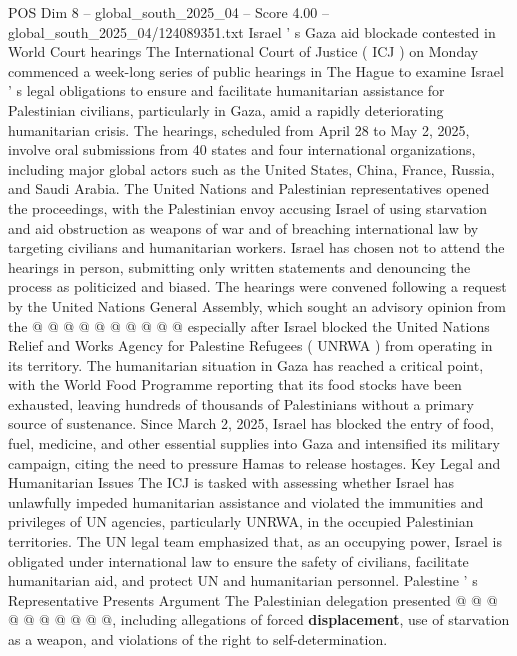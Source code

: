 \begin{textsample}{POS Dim 8 – global\_south\_2025\_04 – Score 4.00 – global\_south\_2025\_04/124089351.txt}  \label{ex:f8_pos_168}
Israel ' s Gaza aid blockade contested in World Court hearings The International Court of Justice ( ICJ ) on Monday commenced a week-long series of public hearings in The Hague to examine Israel ' s legal obligations to ensure and facilitate humanitarian assistance for Palestinian civilians, particularly in Gaza, amid a rapidly deteriorating humanitarian crisis.
The hearings, scheduled from April 28 to May 2, 2025, involve oral submissions from 40 states and four international organizations, including major global actors such as the United States, China, France, Russia, and Saudi Arabia.
The United Nations and Palestinian representatives opened the proceedings, with the Palestinian envoy accusing Israel of using starvation and aid obstruction as weapons of war and of breaching international law by targeting civilians and humanitarian workers.
Israel has chosen not to attend the hearings in person, submitting only written statements and denouncing the process as politicized and biased.
The hearings were convened following a request by the United Nations General Assembly, which sought an advisory opinion from the @ @ @ @ @ @ @ @ @ @ especially after Israel blocked the United Nations Relief and Works Agency for Palestine Refugees ( UNRWA ) from operating in its territory.
The humanitarian situation in Gaza has reached a critical point, with the World Food Programme reporting that its food stocks have been exhausted, leaving hundreds of thousands of Palestinians without a primary source of sustenance.
Since March 2, 2025, Israel has blocked the entry of food, fuel, medicine, and other essential supplies into Gaza and intensified its military campaign, citing the need to pressure Hamas to release hostages.
Key Legal and Humanitarian Issues The ICJ is tasked with assessing whether Israel has unlawfully impeded humanitarian assistance and violated the immunities and privileges of UN agencies, particularly UNRWA, in the occupied Palestinian territories.
The UN legal team emphasized that, as an occupying power, Israel is obligated under international law to ensure the safety of civilians, facilitate humanitarian aid, and protect UN and humanitarian personnel.
Palestine ' s Representative Presents Argument The Palestinian delegation presented @ @ @ @ @ @ @ @ @ @, including allegations of forced \textbf{displacement}, use of starvation as a weapon, and violations of the right to self-determination.

\end{textsample}
